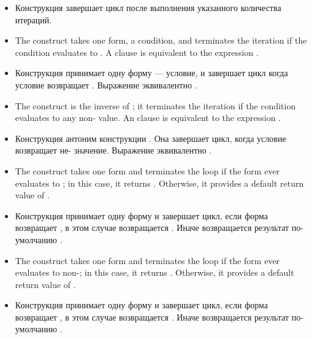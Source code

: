 \begin{itemize}
\begin{itemize}
  \item Конструкция  завершает цикл после выполнения
    указанного количества итераций.

  \item The  construct takes one form, a condition, and
    terminates the iteration if the condition evaluates to .
    A  clause is equivalent to the expression
    .

  \item Конструкция  принимает одну форму --- условие, и
    завершает цикл когда условие возвращает . Выражение
     эквивалентно .

  \item The  construct is the inverse of ; it
    terminates the iteration if the condition evaluates to any
    non- value.  An  clause is equivalent to the
    expression .

  \item Конструкция  антоним конструкции . Она
    завершает цикл, когда условие возвращает не-
    значение. Выражение  эквивалентно
    .

  \item The  construct takes one form and terminates the
    loop if the form ever evaluates to ; in this case, it
    returns .  Otherwise, it provides a default return value
    of .

  \item Конструкция  принимает одну форму и завершает
    цикл, если форма возвращает , в этом случае возвращается
    . Иначе возвращается результат по-умолчанию .

  \item The  construct takes one form and terminates the
    loop if the form ever evaluates to non-; in this case, it
    returns .  Otherwise, it provides a default return value
    of .

  \item Конструкция  принимает одну форму и завершает
    цикл, если форма возвращает , в этом случае возвращается
    . Иначе возвращается результат по-умолчанию .


\end{itemize}
\end{itemize}
